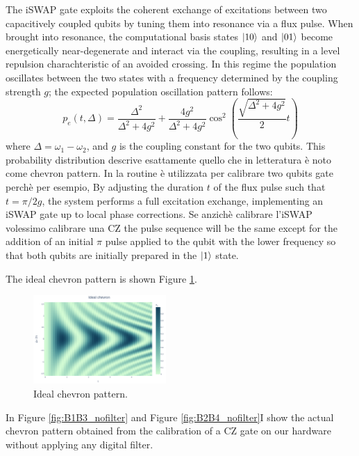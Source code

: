 The iSWAP gate exploits the coherent exchange of excitations between two capacitively coupled qubits by tuning them into resonance via a flux pulse. 
When brought into resonance, the computational basis states $\ket{10}$ and $\ket{01}$ become energetically near-degenerate and interact via the coupling, resulting in a level repulsion charachteristic of an avoided crossing.
In this regime the population oscillates between the two states with a frequency determined by the coupling strength $g$; the expected population oscillation pattern follows:
\begin{equation}
    p_e(t, \Delta) = \frac{\Delta^2}{\Delta^2 + 4g^2} + \frac{4g^2}{\Delta^2 + 4g^2} \cos^2\left(\frac{\sqrt{\Delta^2 + 4g^2}}{2}t\right)
\end{equation}
where $\Delta = \omega_1 - \omega_2$, and $g$ is the coupling constant for the two qubits. This probability distribution descrive esattamente quello che in letteratura è noto come chevron pattern.
In \Qibocal la routine è utilizzata per calibrare two qubits gate perchè per esempio, By adjusting the duration $t$ of the flux pulse such that $t=\pi/2g$, the system performs a full excitation exchange, implementing an iSWAP gate up to local phase corrections.
Se anzichè calibrare l'iSWAP volessimo calibrare una CZ the pulse sequence will be the same except for the addition of an initial $\pi$ pulse applied to the qubit with the lower frequency so that both qubits are initially prepared in the $\ket{1}$ state.

The ideal chevron pattern is shown Figure \ref{fig:expected_chevron}.

\begin{figure}[h!]
    \centering
    \includegraphics[width=0.45\textwidth]{figures/png/IdealChevron.png}
    \caption{Ideal chevron pattern.}
    \label{fig:expected_chevron}
\end{figure}

In Figure \ref{fig:B1B3_nofilter} and Figure \ref{fig:B2B4_nofilter}I show the actual chevron pattern obtained from the calibration of a CZ gate on our hardware without applying any digital filter.

